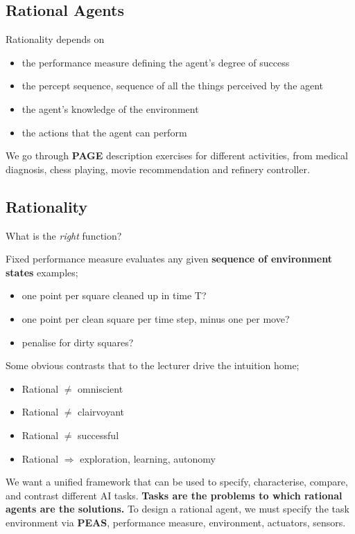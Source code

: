 \documentclass{article}
\begin{document}
\subsection{Rational Agents}
Rationality depends on 
\begin{itemize}
	\item the performance measure defining the agent's degree of success
	\item the percept sequence, sequence of all the things perceived by the agent
	\item the agent's knowledge of the environment
	\item the actions that the agent can perform
\end{itemize}

We go through \textbf{PAGE} description exercises for different activities, from medical diagnosis, chess playing, movie recommendation and refinery controller.

\subsection{Rationality}
What is the \emph{right} function?

Fixed performance measure evaluates any given \textbf{sequence of environment states} examples;
\begin{itemize}
	\item one point per square cleaned up in time T?
	\item one point per clean square per time step, minus one per move?
	\item penalise for dirty squares?
\end{itemize}

Some obvious contrasts that to the lecturer drive the intuition home;
\begin{itemize}
	\item Rational $\neq$ omniscient
	\item Rational $\neq$ clairvoyant
	\item Rational $\neq$ successful
	\item Rational $\Rightarrow$ exploration, learning, autonomy
\end{itemize}

We want a unified framework that can be used to specify, characterise, compare, and contrast different AI tasks. \textbf{Tasks are the problems to which rational agents are the solutions.} To design a rational agent, we must specify the task environment via \textbf{PEAS}, performance measure, environment, actuators, sensors.
\end{document}
